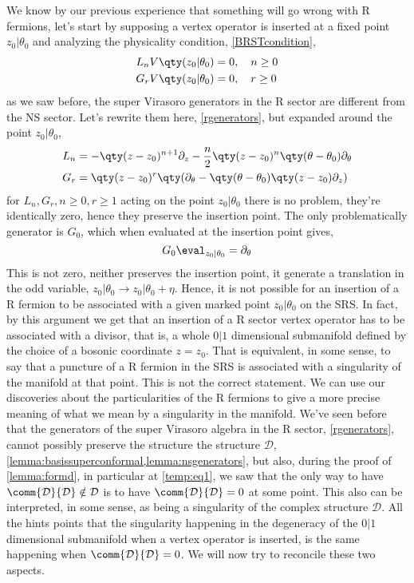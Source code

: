 We know by our previous experience that something will go wrong with R fermions, let's start by supposing a 
vertex operator is inserted at a fixed point $z_0|\theta_0$ and analyzing the physicality 
condition, \cref{BRSTcondition},
\begin{align*}
    L_n V\qty(z_0|\theta_0)&=0,\ \ \ n\geq 0\\
    G_r V\qty(z_0|\theta_0)&=0,\ \ \ r\geq 0
\end{align*}
as we saw before, the super Virasoro generators in the R sector are different from the NS sector. Let's rewrite them here, \cref{rgenerators}, but expanded around 
the point $z_0|\theta_0$,
\begin{align*}
    L_n&=-\qty(z-z_0)^{n+1}\partial_z-\frac{n}{2}\qty(z-z_0)^n\qty(\theta-\theta_0)\partial_\theta\\
    G_r&=\qty(z-z_0)^{r}\qty(\partial_\theta-\qty(\theta-\theta_0)\qty(z-z_0)\partial_z)
\end{align*} 
for $L_n,G_r, n\geq0,r\geq 1$ acting on the point $z_0|\theta_0$ there is no problem, they're identically zero, hence they preserve 
the insertion point. The only problematically generator is $G_0$, which when evaluated at the insertion point gives,
\[G_0\eval_{z_0|\theta_0}=\partial_\theta\]
This is not zero, neither preserves the insertion point, it generate a translation in the odd variable, 
$z_0|\theta_0\rightarrow z_0|\theta_0+\eta$. Hence, it is not possible for an insertion of a R fermion to be 
associated with a given marked point $z_0|\theta_0$ on the SRS. In fact, by this argument we get that an insertion 
of a R sector vertex operator has to be associated with a divisor, that is, a whole $0|1$ dimensional submanifold 
defined by the choice of a bosonic coordinate $z=z_0$. That is equivalent, in some sense, to say that a puncture of 
a R fermion in the SRS is associated with a singularity of the manifold at that point. This is not the correct statement. 
We can use our discoveries about the particularities of the R fermions to give a more precise meaning of what we mean 
by a singularity in the manifold. We've seen before that the generators of the super Virasoro algebra in the R sector, 
\cref{rgenerators}, cannot possibly preserve the structure the structure $\mathcal D$, \cref{lemma:basissuperconformal,lemma:nsgenerators}, 
but also, during the proof of \cref{lemma:formd}, in particular at \cref{temp:eq1}, we saw that the only way to have 
$\comm{\mathcal D}{\mathcal D}\notin\mathcal D$ is to have $\comm{\mathcal D}{\mathcal D}=0$ at some point. This also can be interpreted, 
in some sense, as being a singularity of the complex structure $\mathcal D$. All the hints points that the singularity 
happening in the degeneracy of the $0|1$ dimensional submanifold when a vertex operator is inserted, is the same 
happening when $\comm{\mathcal D}{\mathcal D}=0$. We will now try to reconcile these two aspects.

